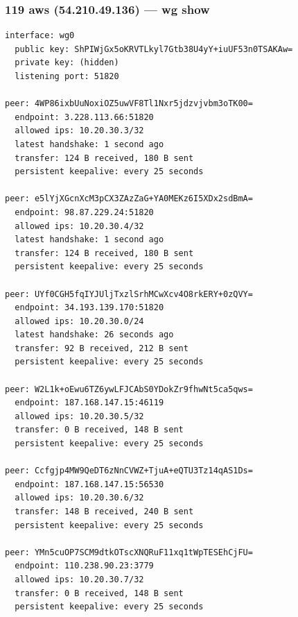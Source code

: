 \documentclass[11pt,a4paper]{article}
\begin{document}
\subsubsection*{119 aws (54.210.49.136) — wg show}
\begin{lstlisting}
interface: wg0
  public key: ShPIWjGx5oKRVTLkyl7Gtb38U4yY+iuUF53n0TSAKAw=
  private key: (hidden)
  listening port: 51820

peer: 4WP86ixbUuNoxiOZ5uwVF8Tl1Nxr5jdzvjvbm3oTK00=
  endpoint: 3.228.113.66:51820
  allowed ips: 10.20.30.3/32
  latest handshake: 1 second ago
  transfer: 124 B received, 180 B sent
  persistent keepalive: every 25 seconds

peer: e5lYjXGcnXcM3pCX3ZAzZaG+YA0MEKz6I5XDx2sdBmA=
  endpoint: 98.87.229.24:51820
  allowed ips: 10.20.30.4/32
  latest handshake: 1 second ago
  transfer: 124 B received, 180 B sent
  persistent keepalive: every 25 seconds

peer: UYf0CGH5fqIYJUljTxzlSrhMCwXcv4O8rkERY+0zQVY=
  endpoint: 34.193.139.170:51820
  allowed ips: 10.20.30.0/24
  latest handshake: 26 seconds ago
  transfer: 92 B received, 212 B sent
  persistent keepalive: every 25 seconds

peer: W2L1k+oEwu6TZ6ywLFJCAbS0YDokZr9fhwNt5ca5qws=
  endpoint: 187.168.147.15:46119
  allowed ips: 10.20.30.5/32
  transfer: 0 B received, 148 B sent
  persistent keepalive: every 25 seconds

peer: Ccfgjp4MW9QeDT6zNnCVWZ+TjuA+eQTU3Tz14qAS1Ds=
  endpoint: 187.168.147.15:56530
  allowed ips: 10.20.30.6/32
  transfer: 148 B received, 240 B sent
  persistent keepalive: every 25 seconds

peer: YMn5cuOP7SCM9dtkOTscXNQRuF11xq1tWpTESEhCjFU=
  endpoint: 110.238.90.23:3779
  allowed ips: 10.20.30.7/32
  transfer: 0 B received, 148 B sent
  persistent keepalive: every 25 seconds

\end{lstlisting}
\end{document}
